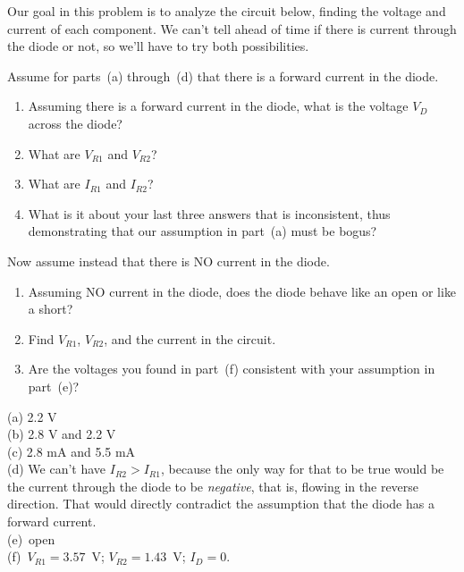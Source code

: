 \begin{Exercise}
\label{prob_first_diode_resistor_with_steps}
Our goal in this problem is to analyze the circuit below, finding the voltage and current of each component.  We can't tell ahead of time if there is current through the diode or not, so we'll have to try both possibilities.  

 {
Assume for parts~(a) through~(d) that there is a forward current in the diode.  
\begin{enumerate}[label=(\alph*),nosep]
\item Assuming there is a forward current in the diode, what is the voltage $V_D$ across the diode?  
\item What are $V_{R1}$ and $V_{R2}$?  
\item What are $I_{R1}$ and $I_{R2}$?
\item What is it about your last three answers that is inconsistent, thus demonstrating that our assumption in part~(a) must be bogus?  
\end{enumerate}
}

Now assume instead that there is NO current in the diode.  
\begin{enumerate}[label=(\alph*),nosep,start=5]
\item Assuming NO current in the diode, does the diode behave like an open or like a short?  
\item Find $V_{R1}$, $V_{R2}$, and the current in the circuit.  
\item Are the voltages you found in part~(f) consistent with your assumption in part~(e)?
\end{enumerate}
\end{Exercise}
\begin{Answer}
(a) 2.2 V \\
(b) 2.8 V and 2.2 V \\
(c) 2.8 mA and 5.5 mA \\
(d) We can't have $I_{R2}>I_{R1}$, because the only way for that to be true would be the current through the diode to be \textit{negative}, that is, flowing in the reverse direction. That would directly contradict the assumption that the diode has a forward current. \\
(e)~open \\
(f)~$V_{R1}=3.57$~V; $V_{R2}=1.43$~V; $I_D=0.$
\end{Answer}


